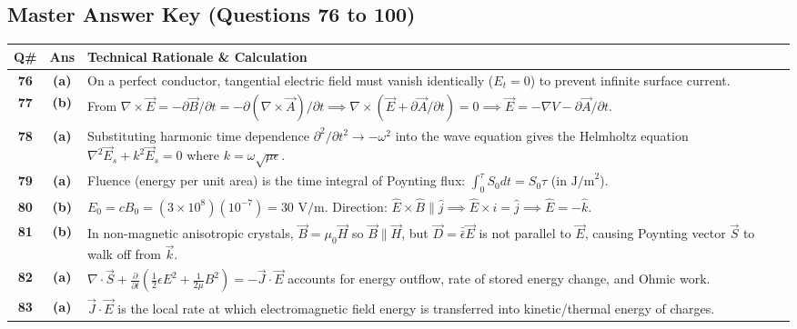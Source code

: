 \newpage

\subsection*{Master Answer Key (Questions 76 to 100)}

{\small
\noindent\begin{tabularx}{\textwidth}{|c|c|X|}
\hline
\textbf{Q\#} & \textbf{Ans} & \textbf{Technical Rationale \& Calculation} \\
\hline
\textbf{76} & \textbf{(a)} & On a perfect conductor, tangential electric field must vanish identically ($E_t = 0$) to prevent infinite surface current. \\ \hline
\textbf{77} & \textbf{(b)} & From $\nabla \times \vec{E} = -\partial\vec{B}/\partial t = -\partial(\nabla\times\vec{A})/\partial t \implies \nabla \times (\vec{E} + \partial\vec{A}/\partial t) = 0 \implies \vec{E} = -\nabla V - \partial\vec{A}/\partial t$. \\ \hline
\textbf{78} & \textbf{(a)} & Substituting harmonic time dependence $\partial^2/\partial t^2 \to -\omega^2$ into the wave equation gives the Helmholtz equation $\nabla^2\vec{E}_s + k^2\vec{E}_s = 0$ where $k = \omega\sqrt{\mu\epsilon}$. \\ \hline
\textbf{79} & \textbf{(a)} & Fluence (energy per unit area) is the time integral of Poynting flux: $\int_0^\tau S_0 dt = S_0 \tau$ (in $\text{J/m}^2$). \\ \hline
\textbf{80} & \textbf{(b)} & $E_0 = c B_0 = (3 \times 10^8)(10^{-7}) = 30\text{ V/m}$. Direction: $\hat{E} \times \hat{B} \parallel \hat{j} \implies \hat{E} \times \hat{i} = \hat{j} \implies \hat{E} = -\hat{k}$. \\ \hline
\textbf{81} & \textbf{(b)} & In non-magnetic anisotropic crystals, $\vec{B} = \mu_0 \vec{H}$ so $\vec{B} \parallel \vec{H}$, but $\vec{D} = \bar{\bar{\epsilon}}\vec{E}$ is not parallel to $\vec{E}$, causing Poynting vector $\vec{S}$ to walk off from $\vec{k}$. \\ \hline
\textbf{82} & \textbf{(a)} & $\nabla \cdot \vec{S} + \frac{\partial}{\partial t}\left(\frac{1}{2}\epsilon E^2 + \frac{1}{2\mu} B^2\right) = -\vec{J}\cdot\vec{E}$ accounts for energy outflow, rate of stored energy change, and Ohmic work. \\ \hline
\textbf{83} & \textbf{(a)} & $\vec{J} \cdot \vec{E}$ is the local rate at which electromagnetic field energy is transferred into kinetic/thermal energy of charges. \\ \hline

\end{tabularx}}
